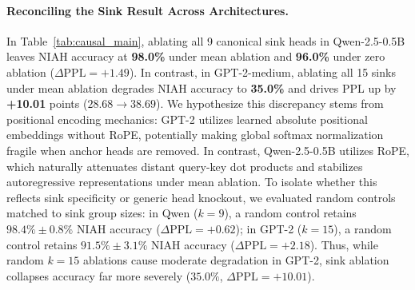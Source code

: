 \documentclass[11pt]{article}
\begin{document}
\paragraph{Reconciling the Sink Result Across Architectures.}
In Table~\ref{tab:causal_main}, ablating all 9 canonical sink heads in Qwen-2.5-0.5B leaves NIAH accuracy at \textbf{98.0\%} under mean ablation and \textbf{96.0\%} under zero ablation ($\Delta\text{PPL} = +1.49$). In contrast, in GPT-2-medium, ablating all 15 sinks under mean ablation degrades NIAH accuracy to \textbf{35.0\%} and drives PPL up by \textbf{+10.01} points ($28.68 \to 38.69$). 
We hypothesize this discrepancy stems from positional encoding mechanics: GPT-2 utilizes learned absolute positional embeddings without RoPE, potentially making global softmax normalization fragile when anchor heads are removed. In contrast, Qwen-2.5-0.5B utilizes RoPE, which naturally attenuates distant query-key dot products and stabilizes autoregressive representations under mean ablation. To isolate whether this reflects sink specificity or generic head knockout, we evaluated random controls matched to sink group sizes: in Qwen ($k=9$), a random control retains $98.4\% \pm 0.8\%$ NIAH accuracy ($\Delta\text{PPL} = +0.62$); in GPT-2 ($k=15$), a random control retains $91.5\% \pm 3.1\%$ NIAH accuracy ($\Delta\text{PPL} = +2.18$). Thus, while random $k=15$ ablations cause moderate degradation in GPT-2, sink ablation collapses accuracy far more severely ($35.0\%$, $\Delta\text{PPL} = +10.01$).

\begin{table}[t]
\centering
\small
{}
\caption{Causal recovery on Indirect Object Identification (IOI, $N=20$) and standard prefix-matching loss increase ($\Delta L_{\text{repeat}}$ on independent held-out random token sequences $[A][B]\dots[A][B]$) in Qwen-2.5-0.5B. Brackets report $\pm$ standard error across $N=20$ paired contrasts. Olsson induction heads recover $67.7\%$ of IOI performance and drive a $+1.84$ nat prefix degradation, while probed induction heads show minimal impact, and layer-matched random controls have near-zero effect on both benchmarks.}
\label{tab:activation_patching}
\end{table}
\end{document}
